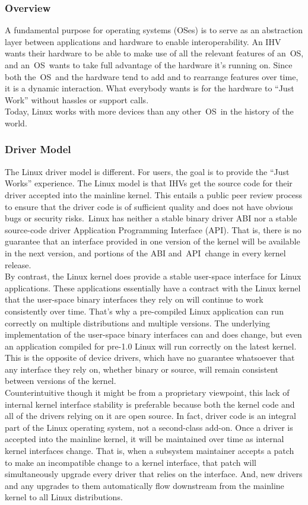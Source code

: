 \subsubsection{Overview}
A fundamental purpose for operating systems (OSes) is to serve as an abstraction layer between applications and hardware to enable interoperability. An IHV wants their hardware to be able to make use of all the relevant features of an OS, and an OS wants to take full advantage of the hardware it's running on. Since both the OS and the hardware tend to add and to rearrange features over time, it is a dynamic interaction. What everybody wants is for the hardware to “Just Work” without hassles or support calls.\\
Today, Linux works with more devices than any other OS in the history of the world.
\subsubsection{Driver Model}
The Linux driver model is different. For users, the goal is to provide the “Just Works” experience. The Linux model is that IHVs get the source code for their driver accepted into the mainline kernel. This entails a public peer review process to ensure that the driver code is of sufficient quality and does not have obvious bugs or security risks. Linux has neither a stable binary driver ABI nor a stable source-code driver Application Programming Interface (API). That is, there is no guarantee that an interface provided in one version of the kernel will be available in the next version, and portions of the ABI and API change in every kernel release.\\
By contrast, the Linux kernel does provide a stable user-space interface for Linux applications. These applications essentially have a contract with the Linux kernel that the user-space binary interfaces they rely on will continue to work consistently over time. That's why a pre-compiled Linux application can run correctly on multiple distributions and multiple versions. The underlying implementation of the user-space binary interfaces can and does change, but even an application compiled for pre-1.0 Linux will run correctly on the latest kernel. This is the opposite of device drivers, which have no guarantee whatsoever that any interface they rely on, whether binary or source, will remain consistent between versions of the kernel.\\
Counterintuitive though it might be from a proprietary viewpoint, this lack of internal kernel interface stability is preferable because both the kernel code and all of the drivers relying on it are open source. In fact, driver code is an integral part of the Linux operating system, not a second-class add-on. Once a driver is accepted into the mainline kernel, it will be maintained over time as internal kernel interfaces change. That is, when a subsystem maintainer accepts a patch to make an incompatible change to a kernel interface, that patch will simultaneously upgrade every driver that relies on the interface. And, new drivers and any upgrades to them automatically flow downstream from the mainline kernel to all Linux distributions.\\
